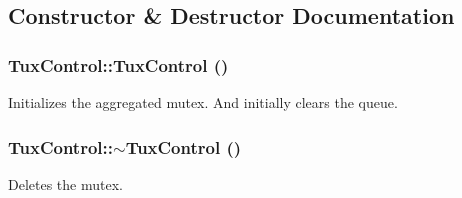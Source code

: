 \subsection{Constructor \& Destructor Documentation}
\hypertarget{classTuxControl_a44c108889313709916fd0b58b80e4376}{
\subsubsection[{TuxControl}]{\setlength{\rightskip}{0pt plus 5cm}TuxControl::TuxControl ()}}
\label{classTuxControl_a44c108889313709916fd0b58b80e4376}
Initializes the aggregated mutex. And initially clears the queue. \hypertarget{classTuxControl_a146627cfdc57247d2e653a8a48f9dd2b}{
\subsubsection[{$\sim$TuxControl}]{\setlength{\rightskip}{0pt plus 5cm}TuxControl::$\sim$TuxControl ()}}
\label{classTuxControl_a146627cfdc57247d2e653a8a48f9dd2b}
Deletes the mutex. 


